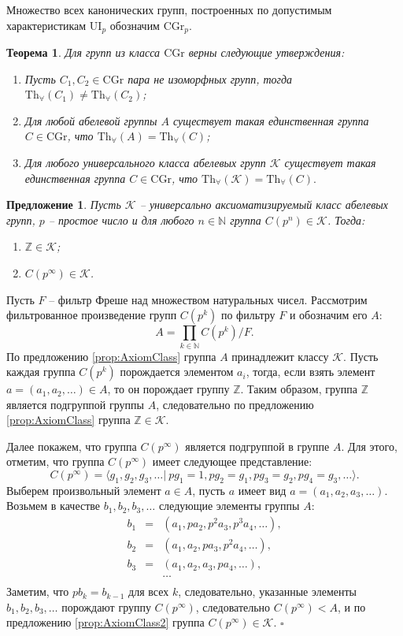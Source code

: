 \documentclass[a4paper,11pt,twoside]{article}
\newtheorem{theorem}{Теорема}[section]
\newtheorem{proposition}{Предложение}[section]
\def\note#1{\marginpar{\textcolor{red}{#1}}}
\def\proof{{\noindent{\bf Доказательство.}} }
\def\K{{\mathcal{K}}}
\def\Z{{\mathbb{Z}}}
\def\N{{\mathbb{N}}}
\def\Tha{{\mathrm{Th}_\forall}}
\def\CG{{\mathrm{CGr}}}
\def\ui{{\mathrm{UI}}}
\begin{document}
Множество всех канонических групп, построенных по допустимым характеристикам $\ui_p$ обозначим $\CG_p$.

\begin{theorem}\label{th:CannonicalGroups}
Для групп из класса $\CG$ верны следующие утверждения:
\begin{enumerate}
\item Пусть $C_1, C_2 \in \CG$ пара не изоморфных групп, тогда $\Tha(C_1) \neq \Tha(C_2)$;
\item Для любой абелевой группы $A$ существует такая единственная группа $C \in \CG$, что $\Tha(A) = \Tha(C)$;
\item Для любого универсального класса абелевых групп $\K$ существует такая единственная группа $C \in \CG$, что $\Tha(\K) = \Tha(C).$
\end{enumerate}
\end{theorem}
\note{Вставить доказательство}


\begin{proposition}
Пусть $\K$ -- универсально аксиоматизируемый класс абелевых групп, $p$ -- простое число и для любого $n \in \N$ группа $C(p^n) \in \K$. Тогда:
\begin{enumerate}
\item $\Z \in \K$;
\item $C(p^\infty) \in \K$.  
\end{enumerate}
\end{proposition}

\proof Пусть $F$ -- фильтр Фреше над множеством натуральных чисел. Рассмотрим фильтрованное произведение групп $C(p^k)$ по фильтру $F$ и обозначим его $A$:
$$A = \prod_{k \in \N} C(p^k) \Big/ F.$$ 
По предложению \ref{prop:AxiomClass} группа $A$ принадлежит классу $\K$. 
Пусть каждая группа $C(p^k)$ порождается элементом $a_i$, тогда, если взять элемент $a = (a_1, a_2, \ldots) \in A$, то он порождает группу $\Z$. Таким образом, группа $\Z$ является подгруппой группы $A$, следовательно по предложению \ref{prop:AxiomClass} группа $\Z \in \K$.

Далее покажем, что группа $C(p^\infty)$ является подгруппой в группе $A$. Для этого, отметим, что группа $C(p^\infty)$ имеет следующее представление:
$$C(p^\infty) = \langle g_1, g_2, g_3, \ldots | \ pg_1 = 1, pg_2 = g_1, pg_3 = g_2, pg_4 = g_3, \ldots \rangle.$$
Выберем произвольный элемент $a \in A$, пусть $a$ имеет вид $a = (a_1, a_2, a_3, \ldots )$. Возьмем в качестве $b_1, b_2, b_3, \ldots$ следующие элементы группы $A$:
$$\begin{array}{ccl}
b_1 & = & (a_1, pa_2, p^2a_3, p^3a_4, \ldots), \\
b_2 & = & (a_1, a_2, pa_3, p^2a_4, \ldots), \\
b_3 & = & (a_1, a_2, a_3, pa_4, \ldots), \\
&  & \ldots \\
\end{array}$$
Заметим, что $pb_k = b_{k-1}$ для всех $k$, следовательно, указанные элементы $b_1, b_2, b_3, \ldots$ порождают группу $C(p^\infty)$, следовательно $C(p^\infty) < A$, и по предложению \ref{prop:AxiomClass2} группа $C(p^\infty) \in \K$. $\square$ 
\end{document}
